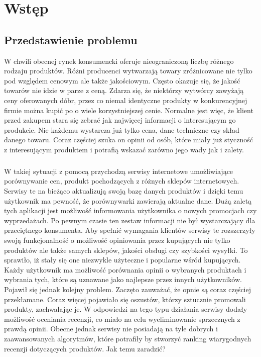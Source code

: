 \chapter{Wstęp}

\section{Przedstawienie problemu}

W chwili obecnej rynek konsumencki oferuje nieograniczoną liczbę różnego rodzaju produktów. Różni producenci wytwarzają towary zróżnicowane nie tylko pod względem cenowym ale także jakościowym. Często okazuje się, że jakość towarów nie idzie w parze z ceną. Zdarza się, że niektórzy wytwórcy  zawyżają ceny oferowanych dóbr, przez co niemal identyczne produkty w konkurencyjnej firmie można kupić po o wiele korzystniejszej cenie. Normalne jest więc, że klient przed zakupem stara się zebrać jak najwięcej informacji o interesującym go produkcie. Nie każdemu wystarcza już tylko cena, dane techniczne czy skład danego towaru.  Coraz częściej szuka on opinii od osób, które miały już styczność z interesującym produktem i potrafią wskazać zarówno jego wady jak i zalety. 
\paragraph{}
W takiej sytuacji z pomocą przychodzą serwisy internetowe umożliwiające porównywanie cen, produkt pochodzących z różnych sklepów internetowych. Serwisy te na bieżąco aktualizują swoją bazę danych produktów i dzięki temu użytkownik ma pewność, że porównywarki zawierają aktualne dane. Dużą zaletą tych aplikacji jest możliwość informowania użytkownika o nowych promocjach czy wyprzedażach. Po pewnym czasie ten zestaw informacji nie był wystarczający dla przeciętnego konsumenta. Aby spełnić wymagania klientów serwisy te rozszerzyły swoją funkcjonalność o możliwość opiniowania przez kupujących nie tylko produktów ale także samych sklepów, jakości obsługi czy szybkości wysyłki. To sprawiło, iż stały się one niezwykle użyteczne i popularne wśród kupujących. Każdy użytkownik ma możliwość porównania opinii o wybranych produktach i wybrania tych, które są uznawane jako najlepsze przez innych użytkowników. Pojawił się jednak kolejny problem. Zaczęto zauważać, że opnie są coraz częściej przekłamane. Coraz więcej pojawiało się oszustów, którzy sztucznie promowali produkty, zachwalając je. W odpowiedzi na tego typu działania serwisy dodały możliwość oceniania recenzji, co miało na celu wyeliminowanie sprzecznych z prawdą opinii. Obecne jednak serwisy nie posiadają na tyle dobrych i zaawansowanych algorytmów, które potrafiły by stworzyć ranking wiarygodnych recenzji dotyczących produktów. Jak temu zaradzić?  


